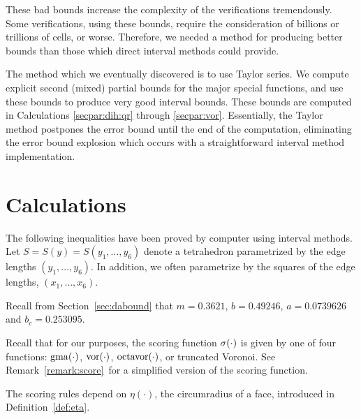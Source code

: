These bad bounds increase the complexity of the verifications tremendously.
Some verifications, using these bounds,
require the consideration of billions or trillions
of cells, or worse.  Therefore, we needed a method for producing
better bounds than those which direct interval methods could
provide.

The method which we eventually discovered is to use Taylor series.
We compute explicit second (mixed) partial bounds for the major
special functions, and use these bounds to produce very good
interval bounds.  These bounds are computed in
Calculations \ref{secpar:dih:qr} through \ref{secpar:vor}.
Essentially, the Taylor method postpones the error bound until the
end of the computation, eliminating the error bound explosion which
occurs with a straightforward interval method implementation.



\section{Calculations}
The following inequalities have been proved by computer using
interval methods.  Let $S = S(y) = S(y_1,\ldots,y_6)$ denote
a tetrahedron parametrized by the edge lengths $(y_1,\ldots,y_6)$.
In addition, we often parametrize by the squares of the edge
lengths, $(x_1,\ldots,x_6)$.

Recall from Section~\ref{sec:dabound} that $m = 0.3621$, $b = 0.49246$,
$a = 0.0739626$ and $b_c = 0.253095$.

Recall that for our purposes,
the scoring function $\operatorname{\sigma}(\cdot)$ is given by one of four functions:
$\operatorname{gma}(\cdot)$, $\operatorname{vor}(\cdot)$, $\operatorname{octavor}(\cdot)$, or truncated Voronoi.
See Remark~\ref{remark:score}\tomcite\ for a simplified version of
the scoring function.

The scoring rules depend on $\eta(\cdot)$, the circumradius of a
face, introduced in Definition~\ref{def:eta}\tomcite.

